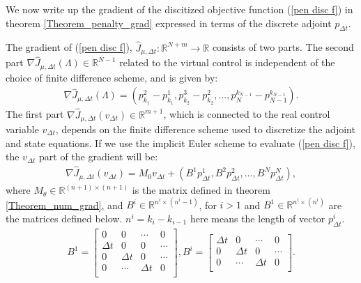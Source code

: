 We now write up the gradient of the discitized objective function (\ref{pen disc f}) in theorem \ref{Theorem_penalty_grad} expressed in terms of the discrete adjoint $p_{\Delta t}$.
\begin{theorem} \label{Theorem_penalty_grad}
The gradient of (\ref{pen disc f}), $\hat J_{\mu,\Delta t}:\mathbb{R}^{N+m}\rightarrow\mathbb{R}$ consists of two parts. The second part $ \nabla\hat J_{\mu,\Delta t}(\Lambda)\in\mathbb{R}^{N-1}$ related to the virtual control is independent of the choice of finite difference scheme, and is given by:
\begin{align}
\nabla\hat J_{\mu,\Delta t}(\Lambda) = (p_{k_1}^{2}-p_{k_1}^{1},p_{k_2}^{3}-p_{k_2}^{2},...,p_{N}^{k_{N-1}}-p_{N-1}^{k_{N-1}}). \label{num_pen_grad_lam}
\end{align} 
The first part $ \nabla\hat J_{\mu,\Delta t}(v_{\Delta t})\in\mathbb{R}^{m+1}$, which is connected to the real control variable  $v_{\Delta t}$, depends on the finite difference scheme used to discretize the adjoint and state equations. If we use the implicit Euler scheme to evaluate (\ref{pen disc f}), the $v_{\Delta t}$ part of the gradient will be:
\begin{align}
\nabla\hat J_{\mu,\Delta t}(v_{\Delta t})= M_{0}v_{\Delta t} + (B^1p_{\Delta t}^1,B^2p_{\Delta t}^2,...,B^Np_{\Delta t}^N), \label{num_pen_grad_v}
\end{align}
where $M_{\theta}\in \mathbb{R}^{(n+1)\times (n+1)}$ is the matrix defined in theorem \ref{Theorem_num_grad}, and $B^i\in \mathbb{R}^{n^i\times (n^i-1)}$, for $i>1$ and $B^1\in \mathbb{R}^{n^i\times (n^i)}$ are the matrices defined below. $n^i=k_i-k_{i-1}$ here means the length of vector $p_{\Delta t}^i$.
\begin{align*}
B^1 = \left[ \begin{array}{cccc}
   0& 0 & \cdots & 0 \\  
   \Delta t& 0 & 0 & \cdots \\ 
   0 & \Delta t& 0  & \cdots \\
   0 &\cdots & \Delta t& 0   \\
   \end{array}  \right]
,B^i = \left[ \begin{array}{cccc}  
   \Delta t& 0 & \cdots & 0 \\ 
   0 & \Delta t& 0  & \cdots \\
   0 &\cdots & \Delta t& 0   \\
   \end{array}  \right] .
\end{align*}

\end{theorem}

